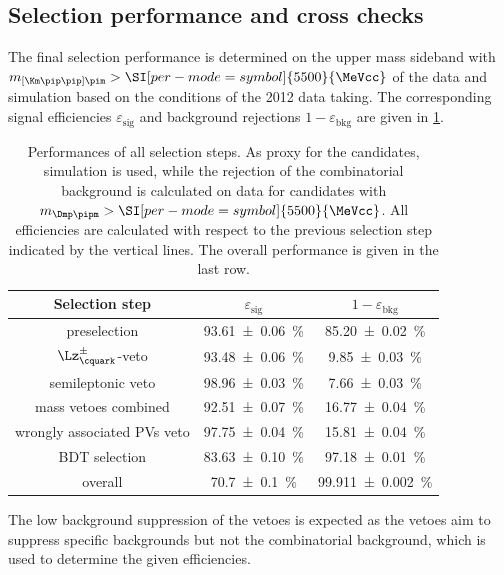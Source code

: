 \subsection{Selection performance and cross checks}
\label{sec:selectionPerformance}

The final selection performance is determined on the upper mass sideband with \mbox{$m_{\left[\Km\pip\pip\right]\pim}>\SI[per-mode=symbol]{5500}{\MeVcc}$} of the data and simulation based on the conditions of the \num{2012} data taking.
The corresponding signal efficiencies $\varepsilon_{\text{sig}}$ and background rejections $1-\varepsilon_{\text{bkg}}$ are given in \cref{tab:selPerform}.
\begin{table}[tbp]
	\centering
	\caption{Performances of all selection steps.
	As proxy for the \BdToDpi candidates, simulation is used, while the rejection of the combinatorial background is calculated on data for candidates with $m_{\Dmp\pipm}>\SI[per-mode=symbol]{5500}{\MeVcc}$.
	All efficiencies are calculated with respect to the previous selection step indicated by the vertical lines.
	The overall performance is given in the last row.}
	\begin{tabular}{ccc}
		\toprule
		Selection step						& $\varepsilon_{\text{sig}}$  & $1-\varepsilon_{\text{bkg}}$ \\
		\midrule
		preselection						& \SI{93.61\pm0.06}{\percent} & \SI{85.20\pm0.02}{\percent} \\
		\midrule
		$\Lz^\pm_\cquark$-veto				& \SI{93.48\pm0.06}{\percent} & \SI{9.85\pm0.03}{\percent} \\
		semileptonic veto					& \SI{98.96\pm0.03}{\percent} & \SI{7.66\pm0.03}{\percent} \\
		mass vetoes combined				& \SI{92.51\pm0.07}{\percent} & \SI{16.77\pm0.04}{\percent} \\
		\midrule
		wrongly associated \ac{PV}s veto	& \SI{97.75\pm0.04}{\percent} & \SI{15.81\pm0.04}{\percent} \\
		BDT selection						& \SI{83.63\pm0.10}{\percent} & \SI{97.18\pm0.01}{\percent} \\
		\midrule
		overall								& \SI{70.7\pm0.1}{\percent}   & \SI{99.911\pm0.002}{\percent} \\
		\bottomrule
	\end{tabular}
	\label{tab:selPerform}
\end{table}
The low background suppression of the vetoes is expected as the vetoes aim to suppress specific backgrounds but not the combinatorial background, which is used to determine the given efficiencies.

